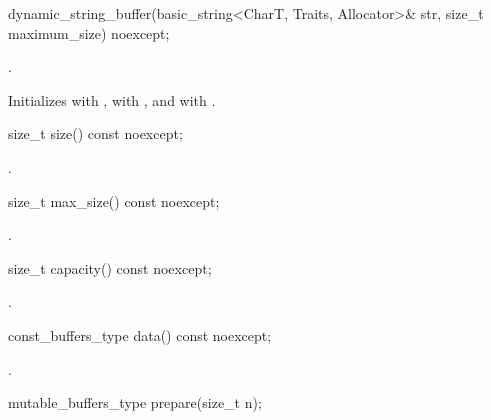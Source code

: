%
\begin{itemdecl}
dynamic_string_buffer(basic_string<CharT, Traits, Allocator>& str,
                      size_t maximum_size) noexcept;
\end{itemdecl}

\begin{itemdescr}
\pnum
\requires {}.

\pnum
\effects Initializes  with ,  with , and  with .
\end{itemdescr}

%
\begin{itemdecl}
size_t size() const noexcept;
\end{itemdecl}

\begin{itemdescr}
\pnum
\returns {}.
\end{itemdescr}

%
\begin{itemdecl}
size_t max_size() const noexcept;
\end{itemdecl}

\begin{itemdescr}
\pnum
\returns {}.
\end{itemdescr}

%
\begin{itemdecl}
size_t capacity() const noexcept;
\end{itemdecl}

\begin{itemdescr}
\pnum
\returns {}.
\end{itemdescr}

%
\begin{itemdecl}
const_buffers_type data() const noexcept;
\end{itemdecl}

\begin{itemdescr}
\pnum
\returns {}.
\end{itemdescr}

%
\begin{itemdecl}
mutable_buffers_type prepare(size_t n);
\end{itemdecl}

